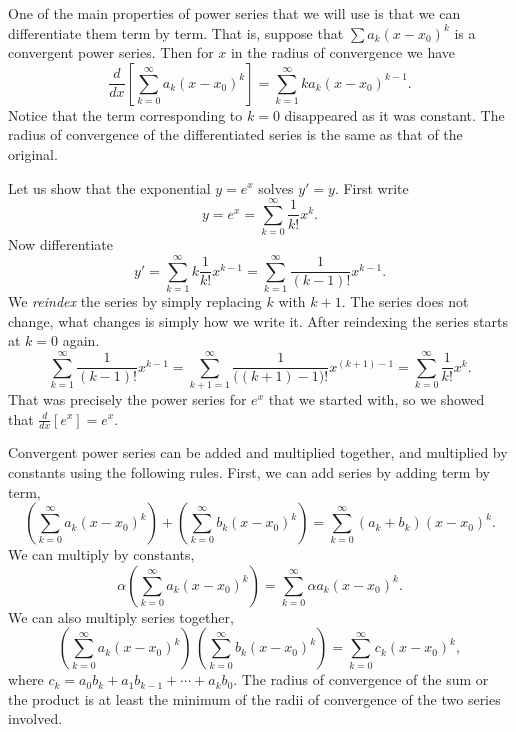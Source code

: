 \documentclass[12pt]{book}
\begin{document}
One of the main properties of power series that we will use is
that we can differentiate them term by term.  That is,
suppose that 
$\sum a_k {(x-x_0)}^k$ is a convergent power series.  Then
for $x$ in the radius of convergence we have
\begin{equation*}
\frac{d}{dx}
\left[\sum_{k=0}^\infty a_k {(x-x_0)}^k\right]
=
\sum_{k=1}^\infty k a_k {(x-x_0)}^{k-1} .
\end{equation*}
Notice that the term corresponding to $k=0$ disappeared as
it was constant.  The radius of convergence of the differentiated
series is the same as that of the original.

\begin{example}
Let us show that the exponential $y=e^x$ solves $y'=y$.  First write
\begin{equation*}
y = e^x = \sum_{k=0}^\infty \frac{1}{k!} x^k .
\end{equation*}
Now differentiate
\begin{equation*}
y' = \sum_{k=1}^\infty k \frac{1}{k!} x^{k-1} =
\sum_{k=1}^\infty \frac{1}{(k-1)!} x^{k-1} .
\end{equation*}
We \emph{reindex}
the series by simply replacing $k$ with $k+1$.  The series
does not change, what changes is simply how we write it.  After
reindexing the series starts 
at $k=0$ again.
\begin{equation*}
\sum_{k=1}^\infty \frac{1}{(k-1)!} x^{k-1} =
\sum_{k+1=1}^\infty \frac{1}{\bigl((k+1)-1\bigr)!} x^{(k+1)-1} =
\sum_{k=0}^\infty \frac{1}{k!} x^k .
\end{equation*}
That was precisely the power series for $e^x$ that we started with,
so we showed that $\frac{d}{dx} [ e^x ] = e^x$.
\end{example}

Convergent power series can be added and multiplied together, and multiplied
by constants using the following rules.  First, we can add series by
adding term by term,
\begin{equation*}
\left(\sum_{k=0}^\infty a_k {(x-x_0)}^k\right)
+
\left(\sum_{k=0}^\infty b_k {(x-x_0)}^k\right)
=
\sum_{k=0}^\infty (a_k+b_k) {(x-x_0)}^k .
\end{equation*}
We can multiply by constants,
\begin{equation*}
\alpha
\left(\sum_{k=0}^\infty a_k {(x-x_0)}^k\right)
=
\sum_{k=0}^\infty \alpha a_k {(x-x_0)}^k .
\end{equation*}
We can also multiply series together,
\begin{equation*}
\left(\sum_{k=0}^\infty a_k {(x-x_0)}^k\right)
\,
\left(\sum_{k=0}^\infty b_k {(x-x_0)}^k\right)
=
\sum_{k=0}^\infty c_k {(x-x_0)}^k ,
\end{equation*}
where
$c_k = a_0b_k + a_1 b_{k-1} + \cdots + a_k b_0$.
The radius of convergence of the sum or the product
is at least the minimum of the radii of convergence of
the two series involved.
\end{document}
